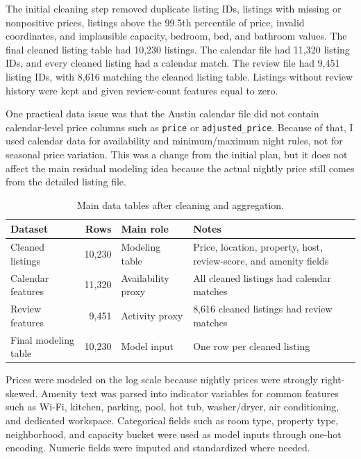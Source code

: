 \documentclass[11pt]{article}
\begin{document}
The initial cleaning step removed duplicate listing IDs, listings with missing or nonpositive prices, listings above the 99.5th percentile of price, invalid coordinates, and implausible capacity, bedroom, bed, and bathroom values. The final cleaned listing table had 10,230 listings. The calendar file had 11,320 listing IDs, and every cleaned listing had a calendar match. The review file had 9,451 listing IDs, with 8,616 matching the cleaned listing table. Listings without review history were kept and given review-count features equal to zero.

One practical data issue was that the Austin calendar file did not contain calendar-level price columns such as \texttt{price} or \texttt{adjusted\_price}. Because of that, I used calendar data for availability and minimum/maximum night rules, not for seasonal price variation. This was a change from the initial plan, but it does not affect the main residual modeling idea because the actual nightly price still comes from the detailed listing file.

\begin{table}[H]
\centering
\caption{Main data tables after cleaning and aggregation.}
\small
\begin{tabular}{L{0.20\textwidth}rL{0.18\textwidth}L{0.42\textwidth}}
\toprule
Dataset & Rows & Main role & Notes \\
\midrule
Cleaned listings & 10,230 & Modeling table & Price, location, property, host, review-score, and amenity fields \\
Calendar features & 11,320 & Availability proxy & All cleaned listings had calendar matches \\
Review features & 9,451 & Activity proxy & 8,616 cleaned listings had review matches \\
Final modeling table & 10,230 & Model input & One row per cleaned listing \\
\bottomrule
\end{tabular}
\end{table}

Prices were modeled on the log scale because nightly prices were strongly right-skewed. Amenity text was parsed into indicator variables for common features such as Wi-Fi, kitchen, parking, pool, hot tub, washer/dryer, air conditioning, and dedicated workspace. Categorical fields such as room type, property type, neighborhood, and capacity bucket were used as model inputs through one-hot encoding. Numeric fields were imputed and standardized where needed.
\end{document}
